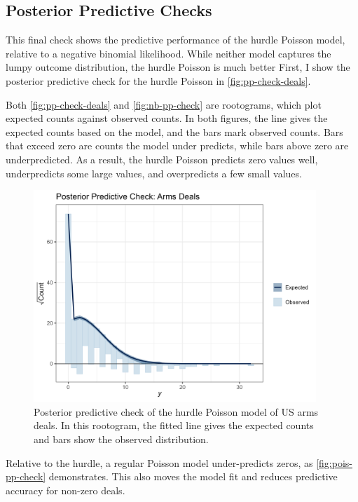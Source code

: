 \documentclass[12pt]{article}
\begin{document}
\subsection{Posterior Predictive Checks}


This final check shows the predictive performance of the hurdle Poisson model, relative to a negative binomial likelihood. 
While neither model captures the lumpy outcome distribution, the hurdle Poisson is much better 
First, I show the posterior predictive check for the hurdle Poisson in \autoref{fig:pp-check-deals}. 


Both \autoref{fig:pp-check-deals} and \autoref{fig:nb-pp-check} are rootograms, which plot expected counts against observed counts. 
In both figures, the line gives the expected counts based on the model, and the bars mark observed counts. 
Bars that exceed zero are counts the model under predicts, while bars above zero are underpredicted. 
As a result, the hurdle Poisson predicts zero values well, underpredicts some large values, and overpredicts a few small values. 



\begin{figure}[htpb]
	\centering
		\includegraphics[width=0.95\textwidth]{pp-check-deals.png}
	\caption{Posterior predictive check of the hurdle Poisson model of US arms deals. In this rootogram, the fitted line gives the expected counts and bars show the observed distribution.}
	\label{fig:pp-check-deals}
\end{figure}


Relative to the hurdle, a regular Poisson model under-predicts zeros, as \autoref{fig:pois-pp-check} demonstrates. 
This also moves the model fit and reduces predictive accuracy for non-zero deals. 
\end{document}
